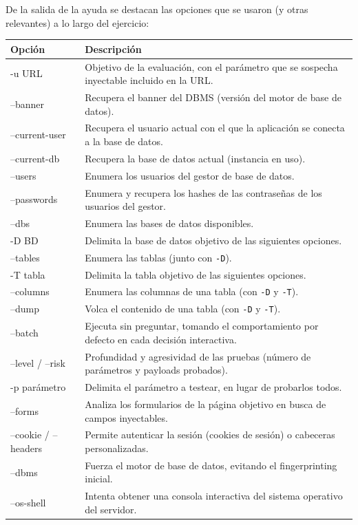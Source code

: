 \begin{respuesta}
  De la salida de la ayuda se destacan las opciones que se usaron (y otras relevantes) a lo largo del ejercicio:

  \begin{center}
  \small
  \begin{tabularx}{\linewidth}{>{\ttfamily}l X}
    \toprule
    \normalfont\bfseries Opción & \bfseries Descripción \\
    \midrule
    -u URL & Objetivo de la evaluación, con el parámetro que se sospecha inyectable incluido en la URL. \\
    --banner & Recupera el banner del DBMS (versión del motor de base de datos). \\
    --current-user & Recupera el usuario actual con el que la aplicación se conecta a la base de datos. \\
    --current-db & Recupera la base de datos actual (instancia en uso). \\
    --users & Enumera los usuarios del gestor de base de datos. \\
    --passwords & Enumera y recupera los hashes de las contraseñas de los usuarios del gestor. \\
    --dbs & Enumera las bases de datos disponibles. \\
    -D BD & Delimita la base de datos objetivo de las siguientes opciones. \\
    --tables & Enumera las tablas (junto con \texttt{-D}). \\
    -T tabla & Delimita la tabla objetivo de las siguientes opciones. \\
    --columns & Enumera las columnas de una tabla (con \texttt{-D} y \texttt{-T}). \\
    --dump & Volca el contenido de una tabla (con \texttt{-D} y \texttt{-T}). \\
    --batch & Ejecuta sin preguntar, tomando el comportamiento por defecto en cada decisión interactiva. \\
    --level / --risk & Profundidad y agresividad de las pruebas (número de parámetros y payloads probados). \\
    -p parámetro & Delimita el parámetro a testear, en lugar de probarlos todos. \\
    --forms & Analiza los formularios de la página objetivo en busca de campos inyectables. \\
    --cookie / --headers & Permite autenticar la sesión (cookies de sesión) o cabeceras personalizadas. \\
    --dbms & Fuerza el motor de base de datos, evitando el fingerprinting inicial. \\
    --os-shell & Intenta obtener una consola interactiva del sistema operativo del servidor. \\
    \bottomrule
  \end{tabularx}
  \end{center}
\end{respuesta}

